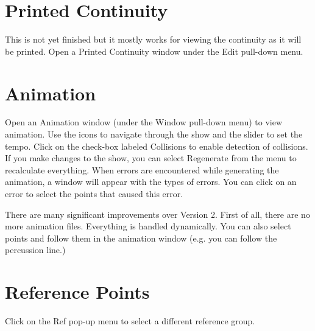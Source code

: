 \section{Printed Continuity}\label{printcont}

This is not yet finished but it mostly works for viewing the continuity
as it will be printed.  Open a Printed Continuity window under the Edit
pull-down menu.

\section{Animation}\label{animwin}

Open an Animation window (under the Window pull-down menu) to view animation.
Use the icons to navigate through the show and the slider to set the tempo.
Click on the check-box labeled Collisions to enable detection of collisions.
If you make changes to the show, you can select Regenerate from the menu
to recalculate everything.  When errors are encountered while generating
the animation, a window will appear with the types of errors.  You can
click on an error to select the points that caused this error.

There are many significant improvements over Version 2.  First of all,
there are no more animation files.  Everything is handled dynamically.
You can also select points and follow them in the animation window
(e.g. you can follow the percussion line.)

\section{Reference Points}\label{refpoints}

Click on the Ref pop-up menu to select a different reference group.
